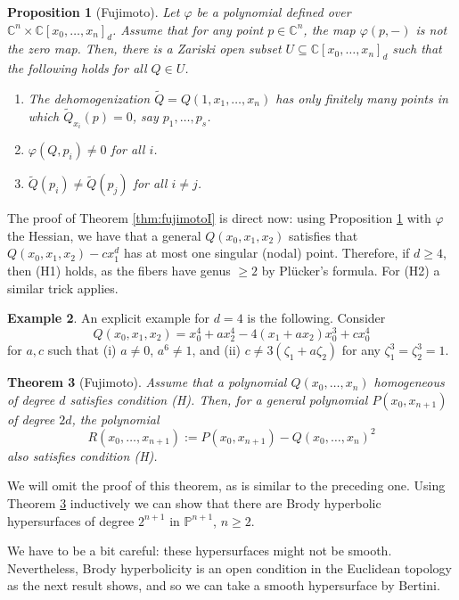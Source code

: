 \documentclass[leqno, openany]{memoir}
\newtheorem{thm}{Theorem}[section]
\newtheorem{prop}[thm]{Proposition}
\theoremstyle{definition}
\newtheorem{exm}[thm]{Example}
\theoremstyle{remark}
\theoremstyle{plain}
\theoremstyle{definition}
\theoremstyle{remark}
\newcommand{\C}{\mathbb{C}}
\renewcommand{\P}{\mathbb{P}}
\begin{document}
\begin{prop}[Fujimoto] \label{prop:fujimotogeneral}
Let $\varphi$ be a polynomial defined over $\C^n \times \C[x_0, \dots, x_n]_d$. Assume that for any point $p \in \C^n$, the map $\varphi(p, -)$ is not the zero map. Then, there is a Zariski open subset $U \subseteq \C[x_0, \dots, x_n]_d$ such that the following holds for all $Q \in U$.
\begin{enumerate}[label=\textit{(\roman*)}]
\item The dehomogenization $\tilde{Q}=Q(1, x_1, \dots, x_n)$ has only finitely many points in which $\tilde{Q}_{x_i}(p)=0$, say $p_1, \dots, p_s$.
\item $\varphi(Q, p_i)\neq 0$ for all $i$.
\item $\tilde{Q}(p_i)\neq \tilde{Q}(p_j)$ for all $i\neq j$. 
\end{enumerate}
\end{prop}

The proof of Theorem \ref{thm:fujimotoI} is direct now: using Proposition \ref{prop:fujimotogeneral} with $\varphi$ the Hessian, we have that a general $Q(x_0, x_1, x_2)$ satisfies that $Q(x_0, x_1, x_2)-cx_1^d$ has at most one singular (nodal) point. Therefore, if $d \geq 4$, then (H1) holds, as the fibers have genus $\geq 2$ by Plücker's formula. For (H2) a similar trick applies. 

\begin{exm}
An explicit example for $d=4$ is the following. Consider
\[ Q(x_0, x_1, x_2) = x_0^4+ax_2^4-4(x_1+ax_2)x_0^3 + cx_0^4 \]
for $a, c$ such that (i) $a\neq 0$, $a^6\neq 1$, and (ii) $c \neq 3(\zeta_1+a\zeta_2)$ for any $\zeta_1^3=\zeta_2^3=1$.
\end{exm}

\begin{thm}[Fujimoto] \label{thm:fujimotoII}
Assume that a polynomial $Q(x_0, \dots, x_n)$ homogeneous of degree $d$ satisfies condition \textit{(H)}. Then, for a general polynomial $P(x_0, x_{n+1})$ of degree $2d$, the polynomial
\[ R(x_0, \dots, x_{n+1}) := P(x_0, x_{n+1}) - Q(x_0, \dots, x_n)^2 \]
also satisfies condition \textit{(H)}.
\end{thm}

We will omit the proof of this theorem, as is similar to the preceding one. Using Theorem \ref{thm:fujimotoII} inductively we can show that there are Brody hyperbolic hypersurfaces of degree $2^{n+1}$ in $\P^{n+1}$, $n \geq 2$.

We have to be a bit careful: these hypersurfaces might not be smooth. Nevertheless, Brody hyperbolicity is an open condition in the Euclidean topology as the next result shows, and so we can take a smooth hypersurface by Bertini.
\end{document}
